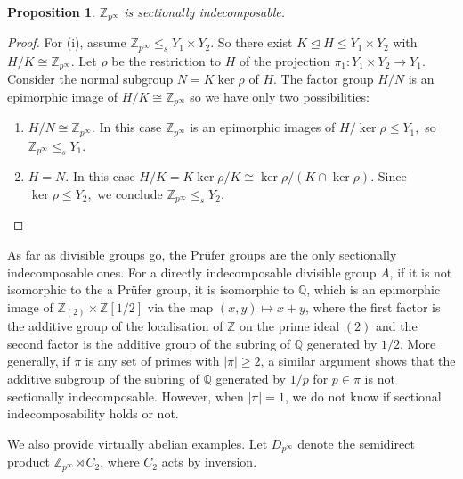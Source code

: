\documentclass[a4paper,10pt]{amsart}
\theoremstyle{plain}
\newtheorem{proposition}[thm]{Proposition}
\theoremstyle{definition}
\begin{document}
\begin{proposition}\label{p:prufer}
    $\mathbb Z_{p^\infty}$ is sectionally indecomposable.
\end{proposition}
\begin{proof}
For (i), assume $\mathbb Z_{p^\infty}\leq_s Y_1\times Y_2$.  So there exist $K\unlhd H\leq Y_1\times Y_2$ with $H/K\cong \mathbb Z_{p^\infty}$. Let $\rho$
be the restriction to $H$ of the projection $\pi_1: Y_1\times Y_2\to Y_1.$ Consider the normal subgroup $N=K\ker \rho$ of $H$. The factor group $H/N$ is an epimorphic image of $H/K\cong \mathbb Z_{p^\infty}$ so we have only two possibilities:
\begin{enumerate} 
\item $H/N\cong \mathbb Z_{p^\infty}.$ In this case $\mathbb Z_{p^\infty}$ is an epimorphic images of $H/\ker\rho \leq Y_1,$ so $\mathbb Z_{p^\infty}\leq_s Y_1.$
\item $H=N.$ In this case $H/K=K\ker\rho/K \cong \ker\rho/(K\cap\ker\rho).$ Since $\ker\rho\leq Y_2,$ we conclude $\mathbb Z_{p^\infty}\leq_s Y_2.$\qedhere
\end{enumerate}
\end{proof}

As far as divisible groups go, the Pr{\"u}fer groups are the only sectionally indecomposable ones. For a directly indecomposable divisible group $A$, if it is not isomorphic to the a Pr{\"u}fer group, it is isomorphic to $\mathbb Q$, which is an epimorphic image of $\mathbb Z_{(2)} \times \mathbb Z [1/2]$ via the map $(x,y) \mapsto x+y$, where the first factor is the additive group of the localisation of $\mathbb Z$ on the prime ideal $(2)$ and the second factor is the additive group of the subring of $\mathbb Q$ generated by $1/2$. More generally, if $\pi$ is any set of primes with $|\pi| \geq 2$, a similar argument shows that the additive subgroup of the subring of $\mathbb Q$ generated by $1/p$ for $p \in \pi$ is not sectionally indecomposable. However, when $|\pi|=1$, we do not know if sectional indecomposability holds or not.

We also provide virtually abelian examples. Let $D_{p^\infty}$ denote the semidirect product $\mathbb Z_{p^\infty} \rtimes C_2$, where $C_2$ acts by inversion.
\end{document}

